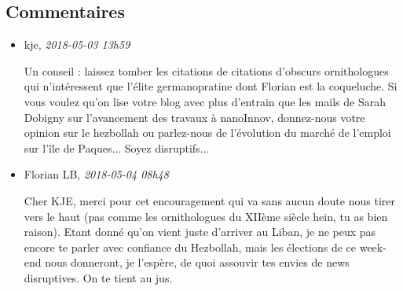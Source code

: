 \documentclass[]{article}
\date{}
\begin{document}
\hypertarget{commentaires}{%
\subsection{Commentaires}\label{commentaires}}

\begin{itemize}
\item
  kje, \emph{2018-05-03 13h59}

  Un conseil : laissez tomber les citations de citations d'obscurs
  ornithologues qui n'intéressent que l'élite germanopratine dont
  Florian est la coqueluche. Si vous voulez qu'on lise votre blog avec
  plus d'entrain que les mails de Sarah Dobigny sur l'avancement des
  travaux à nanoInnov, donnez-nous votre opinion sur le hezbollah ou
  parlez-nous de l'évolution du marché de l'emploi sur l'île de
  Paques... Soyez disruptifs...
\item
  Florian LB, \emph{2018-05-04 08h48}

  Cher KJE, merci pour cet encouragement qui va sans aucun doute nous
  tirer vers le haut (pas comme les ornithologues du XIIème siècle hein,
  tu as bien raison). Etant donné qu'on vient juste d'arriver au Liban,
  je ne peux pas encore te parler avec confiance du Hezbollah, mais les
  élections de ce week-end nous donneront, je l'espère, de quoi assouvir
  tes envies de news disruptives. On te tient au jus.
\end{itemize}
\end{document}
